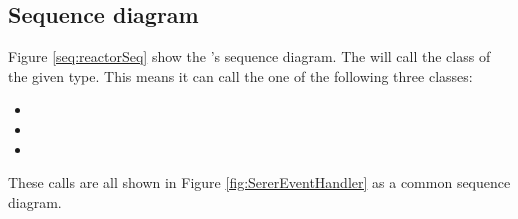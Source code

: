 \documentclass[Main]{subfiles}
\begin{document}
\subsection{Sequence diagram}
Figure \ref{seq:reactorSeq} show the 's sequence diagram.
The  will call the class of the given type.
This means it can call the one of the following three classes:
\begin{itemize}
	\item {}
	\item {}
	\item {}
\end{itemize}

These calls are all shown in Figure \ref{fig:SererEventHandler} as a common sequence diagram.
\newpage
\end{document}
